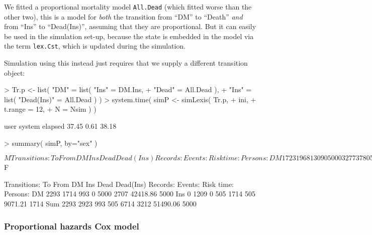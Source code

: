 \documentclass[a4paper,twoside,12pt]{report}
\begin{document}
We fitted a proportional mortality model \texttt{All.Dead} (which fitted
worse than the other two), this is a model for \emph{both} the
transition from ``DM'' to ``Death'' \emph{and} from ``Ins'' to
``Dead(Ins)'', assuming that they are proportional. But it can easily
be used in the simulation set-up, because the state is embedded in the
model via the term \texttt{lex.Cst}, which is updated during the simulation.

Simulation using this instead just requires that we supply a different
transition object:
\begin{Schunk}
\begin{Sinput}
> Tr.p <- list( "DM" = list( "Ins"       = DM.Ins,
+                            "Dead"      = All.Dead  ),
+              "Ins" = list( "Dead(Ins)" = All.Dead ) )
> system.time( simP <- simLexis( Tr.p,
+                                 ini,
+                             t.range = 12,
+                                   N = Nsim ) )
\end{Sinput}
\begin{Soutput}
   user  system elapsed 
  37.45    0.61   38.18 
\end{Soutput}
\begin{Sinput}
> summary( simP, by="sex" )
\end{Sinput}
\begin{Soutput}
$M
     
Transitions:
     To
From    DM  Ins Dead Dead(Ins)  Records:  Events: Risk time:  Persons:
  DM  1723 1968 1309         0      5000     3277   37805.98      5000
  Ins    0 1113    0       855      1968      855    9712.45      1968
  Sum 1723 3081 1309       855      6968     4132   47518.43      5000

$F
     
Transitions:
     To
From    DM  Ins Dead Dead(Ins)  Records:  Events: Risk time:  Persons:
  DM  2293 1714  993         0      5000     2707   42418.86      5000
  Ins    0 1209    0       505      1714      505    9071.21      1714
  Sum 2293 2923  993       505      6714     3212   51490.06      5000
\end{Soutput}
\end{Schunk}

\subsubsection{Proportional hazards Cox model}
\end{document}
